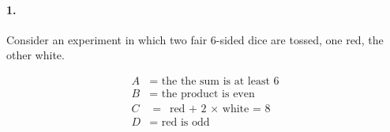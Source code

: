 

\renewcommand\assignment{Worksheet 7, due Monday 6 February, 4:15pm}

\def\firstcircle{(0:1.75cm) circle (2.5cm)}
\def\secondcircle{(180:1.75cm) circle (2.5cm)}



    \paragraph*{1.}
    Consider an experiment in which two fair 6-sided dice are tossed, one red, the other white.

    \begin{align*}
        A & = \text{ the the sum is at least 6} \\
        B & = \text{ the product is even} \\
        C & = \text{ red + 2 $\times$ white = 8} \\
        D & = \text{ red is odd} \\
    \end{align*}

